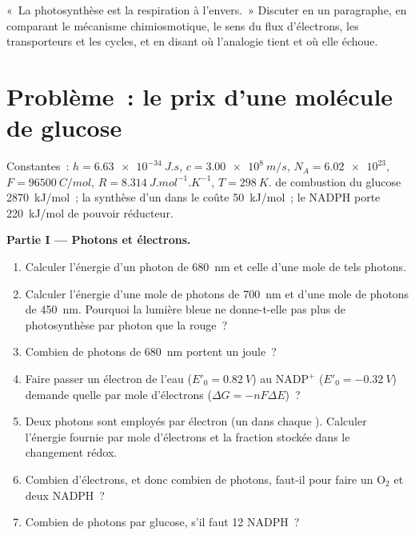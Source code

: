 \begin{exercise}[$\star\star\star$]\label{exo:b1:photosynthesis:12}
«~La photosynthèse est la respiration à l'envers.~» Discuter en un
paragraphe, en comparant le mécanisme chimiosmotique, le sens du flux
d'électrons, les transporteurs et les cycles, et en disant où
l'analogie tient et où elle échoue.
\end{exercise}

\section{Problème~: le prix d'une molécule de glucose}

\begin{problem}
\label{pb:b1:photosynthesis:1}
Constantes~: $h = \qty{6.63e-34}{J.s}$, $c = \qty{3.00e8}{m/s}$,
$N_A = \num{6.02e23}$, $F = \qty{96500}{C/mol}$, $R = \qty{8.314}{J.mol^{-1}.K^{-1}}$,
$T = \qty{298}{K}$.  de combustion du glucose
\qty{2870}{kJ/mol}~; la synthèse d'un  dans le  coûte
\qty{50}{kJ/mol}~; le NADPH porte \qty{220}{kJ/mol} de pouvoir réducteur.

\medskip
\noindent\textbf{Partie I --- Photons et électrons.}
\begin{enumerate}
  \item Calculer l'énergie d'un photon de \qty{680}{nm} et celle d'une
        mole de tels photons.
  \item Calculer l'énergie d'une mole de photons de \qty{700}{nm} et
        d'une mole de photons de \qty{450}{nm}. Pourquoi la lumière
        bleue ne donne-t-elle pas plus de photosynthèse par photon que
        la rouge~?
  \item Combien de photons de \qty{680}{nm} portent un joule~?
  \item Faire passer un électron de l'eau ($E'_0 = \qty{+0.82}{V}$) au
        $\mathrm{NADP^+}$ ($E'_0 = \qty{-0.32}{V}$) demande quelle
         par mole d'électrons ($\Delta G = -nF\Delta E$)~?
  \item Deux photons sont employés par électron (un dans chaque
        ). Calculer l'énergie fournie par mole d'électrons
        et la fraction stockée dans le changement rédox.
  \item Combien d'électrons, et donc combien de photons, faut-il pour
        faire un $\mathrm{O_2}$ et deux NADPH~?
  \item Combien de photons par glucose, s'il faut 12 NADPH~?
\end{enumerate}


\end{problem}
